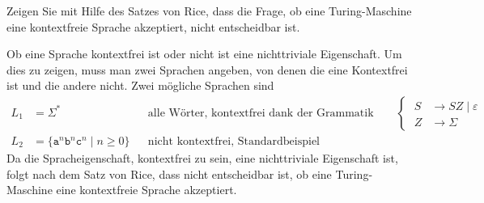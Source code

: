 Zeigen Sie mit Hilfe des Satzes von Rice, dass die Frage, ob eine
Turing-Maschine eine kontextfreie Sprache akzeptiert, nicht entscheidbar
ist.

\begin{loesung}
Ob eine Sprache kontextfrei ist oder nicht ist eine nichttriviale
Eigenschaft.
Um dies zu zeigen, muss man zwei Sprachen angeben, von denen die eine
Kontextfrei ist und die andere nicht.
Zwei mögliche Sprachen sind
\begin{align*}
L_1
&=
\Sigma^*&&\text{alle Wörter, kontextfrei dank der Grammatik}
\qquad
\left\{
\;
\begin{aligned}
S&\to SZ\mid \varepsilon\\
Z&\to \Sigma
\end{aligned}
\right.
\\
L_2
&=
\{\texttt{a}^n\texttt{b}^n\texttt{c}^n
\mid
n\ge 0
\}
&&\text{nicht kontextfrei, Standardbeispiel}
\end{align*}
Da die Spracheigenschaft, kontextfrei zu sein, eine nichttriviale
Eigenschaft ist, folgt nach dem Satz von Rice, dass nicht entscheidbar
ist, ob eine Turing-Maschine eine kontextfreie Sprache akzeptiert.
\end{loesung}
